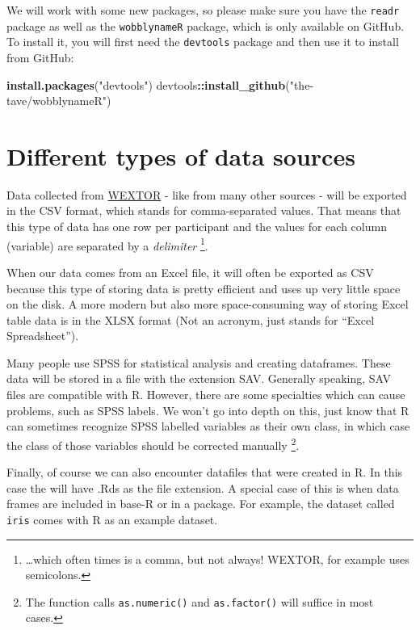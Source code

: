 \documentclass[
]{book}
\newenvironment{Shaded}{\begin{snugshade}}{\end{snugshade}}
\newcommand{\FunctionTok}[1]{\textcolor[rgb]{0.13,0.29,0.53}{\textbf{#1}}}
\newcommand{\NormalTok}[1]{#1}
\newcommand{\SpecialCharTok}[1]{\textcolor[rgb]{0.81,0.36,0.00}{\textbf{#1}}}
\newcommand{\StringTok}[1]{\textcolor[rgb]{0.31,0.60,0.02}{#1}}
\begin{document}
We will work with some new packages, so please make sure you have the \texttt{readr} package as well as the \texttt{wobblynameR} package, which is only available on GitHub.
To install it, you will first need the \texttt{devtools} package and then use it to install from GitHub:

\begin{Shaded}
\begin{Highlighting}[]
\FunctionTok{install.packages}\NormalTok{(}\StringTok{"devtools"}\NormalTok{)}
\NormalTok{devtools}\SpecialCharTok{::}\FunctionTok{install\_github}\NormalTok{(}\StringTok{"the{-}tave/wobblynameR"}\NormalTok{)}
\end{Highlighting}
\end{Shaded}

\section{Different types of data sources}\label{different-types-of-data-sources}

Data collected from \href{https://www.wextor.eu}{WEXTOR} - like from many other sources - will be exported in the CSV format, which stands for comma-separated values.
That means that this type of data has one row per participant and the values for each column (variable) are separated by a \emph{delimiter} \footnote{\ldots which often times is a comma, but not always! WEXTOR, for example uses semicolons.}.

When our data comes from an Excel file, it will often be exported as CSV because this type of storing data is pretty efficient and uses up very little space on the disk.
A more modern but also more space-consuming way of storing Excel table data is in the XLSX format (Not an acronym, just stands for ``Excel Spreadsheet'').

Many people use SPSS for statistical analysis and creating dataframes.
These data will be stored in a file with the extension SAV.
Generally speaking, SAV files are compatible with R.
However, there are some specialties which can cause problems, such as SPSS labels.
We won't go into depth on this, just know that R can sometimes recognize SPSS labelled variables as their own class, in which case the class of those variables should be corrected manually \footnote{The function calls \texttt{as.numeric()} and \texttt{as.factor()} will suffice in most cases.}.

Finally, of course we can also encounter datafiles that were created in R.
In this case the will have .Rds as the file extension.
A special case of this is when data frames are included in base-R or in a package.
For example, the dataset called \texttt{iris} comes with R as an example dataset.
\end{document}
